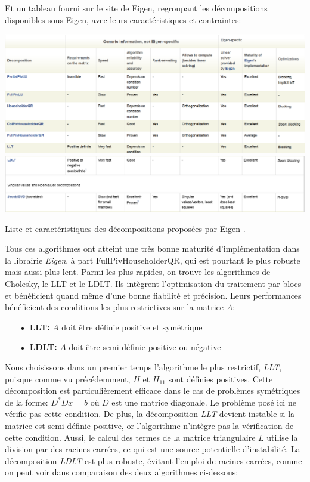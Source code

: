 \documentclass{report}
\begin{document}
Et un tableau fourni sur le site de Eigen, regroupant les décompositions disponibles sous Eigen, avec leurs caractéristiques et contraintes:

\begin{table}[H]
\centering
\includegraphics[width=\textwidth]{figs/decompositionCatalogueEigen1.png}
\includegraphics[width=\textwidth]{figs/decompositionCatalogueEigen2.png}
\caption[Table caption text]{Liste et caractéristiques des décompositions proposées par Eigen \cite{bib_eigen_tutorial_catalogue}.}
\label{table:catalogue}
\end{table}

Tous ces algorithmes ont atteint une très bonne maturité d'implémentation dans la librairie \emph{Eigen}, à part FullPivHouseholderQR, qui est pourtant le plus robuste mais aussi plus lent. Parmi les plus rapides, on trouve les algorithmes de Cholesky, le LLT et le LDLT. Ils intègrent l'optimisation du traitement par blocs et bénéficient quand même d'une bonne fiabilité et précision. Leurs performances bénéficient des conditions les plus restrictives sur la matrice $A$:
\begin{itemize}
\item[\textbf{• LLT:}] $A$ doit être définie positive et symétrique
\item[\textbf{• LDLT:}] $A$ doit être semi-définie positive ou négative
\end{itemize}

Nous choisissons dans un premier temps l'algorithme le plus restrictif, \emph{LLT}, puisque comme vu précédemment, $H$ et $H_{11}$ sont définies positives. Cette décomposition est particulièrement efficace dans le cas de problèmes symétriques de la forme: $D^* D x = b$ \cite{bib_eigen_LLT_desc} où $D$ est une matrice diagonale. Le problème posé ici ne vérifie pas cette condition.
De plus, la décomposition \emph{LLT} devient instable si la matrice est semi-définie positive, or l'algorithme n'intègre pas la vérification de cette condition. Aussi, le calcul des termes de la matrice triangulaire $L$ utilise la division par des racines carrées, ce qui est une source potentielle d'instabilité. La décomposition \emph{LDLT} est plus robuste, évitant l'emploi de racines carrées, comme on peut voir dans comparaison des deux algorithmes ci-dessous:
\end{document}
